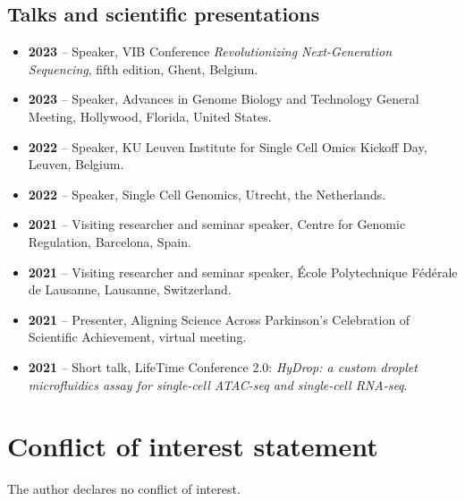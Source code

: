 \section*{Talks and scientific presentations}
\begin{itemize}
    \item \textbf{2023} -- Speaker, VIB Conference \emph{Revolutionizing Next-Generation Sequencing}, fifth edition, Ghent, Belgium.
    \item \textbf{2023} -- Speaker, Advances in Genome Biology and Technology General Meeting, Hollywood, Florida, United States.
    \item \textbf{2022} -- Speaker, KU Leuven Institute for Single Cell Omics Kickoff Day, Leuven, Belgium.
    \item \textbf{2022} -- Speaker, Single Cell Genomics, Utrecht, the Netherlands.
    \item \textbf{2021} -- Visiting researcher and seminar speaker, Centre for Genomic Regulation, Barcelona, Spain.
    \item \textbf{2021} -- Visiting researcher and seminar speaker, \'Ecole Polytechnique F\'ed\'erale de Lausanne, Lausanne, Switzerland.
    \item \textbf{2021} -- Presenter, Aligning Science Across Parkinson's Celebration of Scientific Achievement, virtual meeting.
    \item \textbf{2021} -- Short talk, LifeTime Conference 2.0: \emph{HyDrop: a custom droplet microfluidics assay for single-cell ATAC-seq and single-cell RNA-seq}.
\end{itemize}

\endgroup

\chapter*{Conflict of interest statement}
The author declares no conflict of interest.
